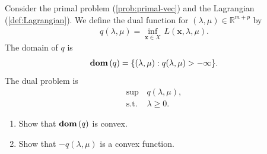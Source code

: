 \documentclass[11pt,letter,notitlepage]{article}
\DeclareMathOperator*{\dom}{\bf dom\,}
\begin{document}
\newpage
\begin{exercise}
Consider the primal problem (\ref{prob:primal-vec}) and the Lagrangian (\ref{def:Lagrangian}). We define the dual function for $(\lambda,\mu)\in\mathbb{R}^{m+p}$ by
\begin{align*}
	q(\lambda,\mu)=\inf_{\mathbf{x}\in X}\,L(\mathbf{x},\lambda,\mu).
\end{align*}
The domain of $q$ is 
\begin{align*}
    \dom(q)=\{(\lambda,\mu):q(\lambda,\mu)>-\infty\}.
\end{align*}
The dual problem is
\begin{align*}
	\sup\,&q(\lambda,\mu),\\
	\mbox{s.t. }&\lambda\geq0.
\end{align*}
\begin{enumerate}
    \item Show that $\dom(q)$ is convex.
    \item Show that $-q(\lambda,\mu)$ is a convex function.
\end{enumerate}
\end{exercise}
\end{document}
